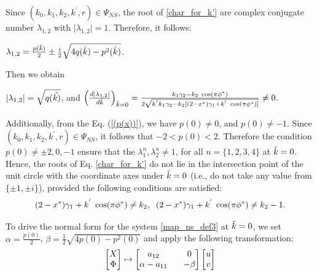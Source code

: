 \documentclass{article}
\begin{document}
\noindent Since $(k_0,k_1,k_2,k^{'},r) \in \Psi_{NS}$, the root of \eqref{char_for_k'} are complex conjugate number $\lambda_{1,2}$ with $\lvert \lambda_{1,2} \rvert = 1$. Therefore, it follows:

$\lambda_{1,2} = \frac{p(\Tilde{k})}{2} \pm \frac{i}{2}\sqrt{4q(\Tilde{k})-p^2(\Tilde{k})}$.

\noindent Then we obtain

$\lvert \lambda_{1,2} \rvert = \sqrt{q(\Tilde{k)}}$,\; and \;$\left(\frac{d \lvert \lambda_{1,2} \rvert}{d\Tilde{k}}\right)_{\Tilde{k}=0}  = \frac{k_1\gamma_2-k_2\;\cos(\pi\phi^*)}{2\sqrt{k^{'}k_1\gamma_2-k_2[(2-x^*)\gamma_1+k^{'}\;\cos(\pi\phi^*)]}} \neq 0$.

\vspace{0.2cm}
\noindent Additionally, from the Eq. (\ref{(p(x))}), we have $p(0) \neq 0$, and $p(0) \neq -1$. Since $(k_0,k_1,k_2,k^{'},r) \in \Psi_{NS}$, it follows that $-2<p(0)<2$. Therefore the condition $p(0) \neq \pm 2,0,-1$ ensure that the $\lambda_1^n,  \lambda_2^n \neq1$, for all $ n=\{1,2,3,4\}$ at $\Tilde{k}=0$. Hence, the roots of Eq. \eqref{char_for_k'} do not lie in the intersection point of the unit circle with the coordinate axes under $\Tilde{k}=0$ (i.e., do not take any value from $\{\pm 1, \pm i\}$), provided the following conditions are satisfied:
\begin{equation}\label{resonance}
    (2-x^*)\gamma_1+k^{'}\;\cos(\pi\phi^*) \neq k_2 , \hspace{0.2cm}   (2-x^*)\gamma_1+k^{'}\;\cos(\pi\phi^*) \neq k_2 -1.
\end{equation}

\noindent To drive the normal form for the system \eqref{map_ns_def3} at $\Tilde{k}=0$, we set $\alpha=\frac{p(0)}{2}$, $\beta=\frac{1}{2}\sqrt{4p(0)-p^2(0)}$ and apply the following transformation:
\begin{equation}\label{map_ns_def4}
 \begin{bmatrix} X \\ \Phi \end{bmatrix}  \mapsto 
  \begin{bmatrix} a_{12} \hspace{0.3cm} &  0 \\ \alpha-a_{11} \hspace{0.3cm} &  -\beta \end{bmatrix}  \begin{bmatrix} u \\ v \end{bmatrix}
\end{equation}
\end{document}
